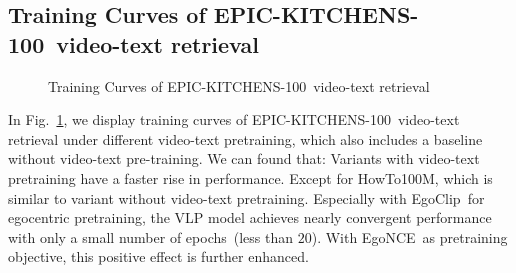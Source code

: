 \documentclass{article}
\newcommand{\dataset}{EgoClip}
\newcommand{\model}{EgoNCE\xspace}
\newcommand{\epic}{EPIC-KITCHENS-100}
\newcommand{\howto}{HowTo100M}
\begin{document}
\subsection{Training Curves of \epic~video-text retrieval}
\begin{figure}[htb]
\centering
\vspace{-0.75cm}
\centering
\vspace{-0.25cm}
\caption{Training Curves of \epic~video-text retrieval}
\label{fig_epic_curve}
\end{figure} In Fig.~\ref{fig_epic_curve}, we display training curves of \epic~video-text retrieval under different video-text pretraining, which also includes a baseline without video-text pre-training.
We can found that:
Variants with video-text pretraining have a faster rise in performance. 
Except for \howto, which is similar to variant without video-text pretraining. Especially with \dataset~for egocentric pretraining, the VLP model achieves nearly convergent performance with only a small number of epochs~(less than $20$).
With \model~as pretraining objective, this positive effect is further enhanced.
\end{document}
